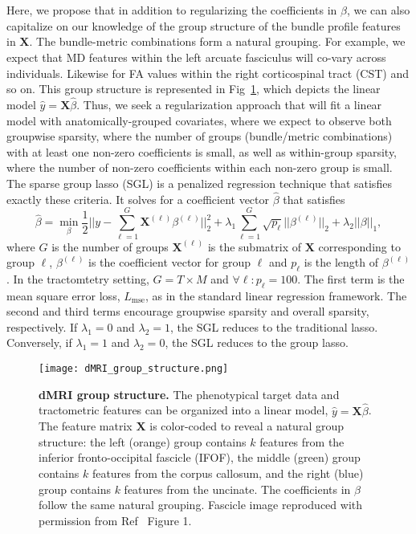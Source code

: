 Here, we propose that in addition to regularizing the coefficients
in $\hat{\beta}$, we can also capitalize on our knowledge of the
group structure of the bundle profile features in $\mathbf{X}$. The
bundle-metric combinations form a natural grouping. For example, we
expect that MD features within the left arcuate fasciculus will
co-vary across individuals. Likewise for FA values within the right
corticospinal tract (CST) and so on. This group structure is represented
in Fig~\ref{fig:group-structure}, which depicts the linear model
$\hat{y} = \mathbf{X} \hat{\beta}$. Thus, we seek a regularization
approach that will fit a linear model with anatomically-grouped
covariates, where we expect to observe both groupwise sparsity, where
the number of groups (bundle/metric combinations) with at least one
non-zero coefficients is small, as well as within-group sparsity, where
the number of non-zero coefficients within each non-zero group is small.
The sparse group lasso (SGL) is a penalized regression technique that
satisfies exactly these criteria\cite{simon2013sparse}. It solves for a
coefficient vector
$\hat{\beta}$ that satisfies
\begin{equation}
    \hat{\beta} = \min_\beta \frac{1}{2}
    ||y - \displaystyle \sum_{\ell = 1}^{G}
    \mathbf{X}^{(\ell)} \beta^{(\ell)}||_2^2
    + \lambda_1 \displaystyle \sum_{\ell = 1}^{G}
    \sqrt{p_\ell} ||\beta^{(\ell)}||_2
    + \lambda_2 ||\beta||_1,
    \label{eq:sgl}
\end{equation}
where $G$ is the number of groups $\mathbf{X}^{(\ell)}$ is the submatrix
of $\mathbf{X}$ corresponding to group $\ell$, $\beta^{(\ell)}$ is
the coefficient vector for group $\ell$ and $p_\ell$ is the length of
$\beta^{(\ell)}$. In the tractomtetry setting, $G = T \times M$ and
$\forall \ell: p_\ell = 100$. The first term is the mean square error
loss, $L_{\text{mse}}$, as in the standard linear regression framework.
The second and third terms encourage groupwise sparsity and overall
sparsity, respectively. If $\lambda_1 = 0$ and $\lambda_2 = 1$, the
SGL reduces to the traditional lasso\cite{tibshirani1996regression}.
Conversely, if $\lambda_1 = 1$ and $\lambda_2 = 0$, the SGL reduces to
the group lasso\cite{yuan2006model}.

\begin{figure}[!h]
    \centering
    \texttt{[image: dMRI\_group\_structure.png]}
    \caption{{\bf dMRI group structure.}
        The phenotypical target data and tractometric features can
        be organized into a linear model, $\hat{y} = \mathbf{X}
        \hat{\beta}$. The feature matrix $\mathbf{X}$ is color-coded
        to reveal a natural group structure: the left (orange) group
        contains $k$ features from the inferior fronto-occipital
        fascicle (IFOF), the middle (green) group contains $k$ features
        from the corpus callosum, and the right (blue) group
        contains $k$ features from the uncinate. The coefficients in
        $\hat{\beta}$ follow the same natural grouping. Fascicle image
        reproduced with permission from Ref~\cite{yeatman2012tract}
        Figure 1.
    }
    \label{fig:group-structure}
\end{figure}


